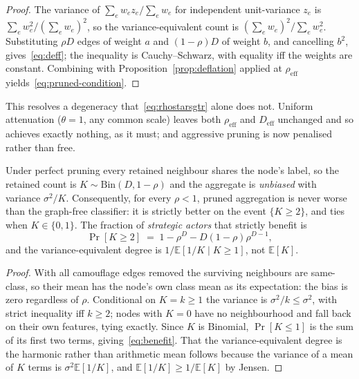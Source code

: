 \documentclass[../elsevier.tex]{subfiles}
\begin{document}
\begin{proof}
The variance of $\sum_e w_e z_e / \sum_e w_e$ for independent unit-variance $z_e$ is
$\sum_e w_e^2/(\sum_e w_e)^2$, so the variance-equivalent count is
$(\sum_e w_e)^2/\sum_e w_e^2$. Substituting $\rho D$ edges of weight $a$ and
$(1-\rho)D$ of weight $b$, and cancelling $b^2$, gives~\eqref{eq:deff}; the
inequality is Cauchy--Schwarz, with equality iff the weights are constant.
Combining with Proposition~\ref{prop:deflation} applied at $\rho_{\mathrm{eff}}$
yields~\eqref{eq:pruned-condition}.
\end{proof}

This resolves a degeneracy that~\eqref{eq:rhostarsgtr} alone does not. Uniform
attenuation ($\theta = 1$, any common scale) leaves both $\rho_{\mathrm{eff}}$ and
$D_{\mathrm{eff}}$ unchanged and so achieves exactly nothing, as it must; and
aggressive pruning is now penalised rather than free.

\begin{proposition}
\label{cor:ceiling}
Under perfect pruning every retained neighbour shares the node's label, so the
retained count is $K \sim \mathrm{Bin}(D, 1-\rho)$ and the aggregate is
\emph{unbiased} with variance $\sigma^2/K$. Consequently, for every $\rho<1$,
pruned aggregation is never worse than the graph-free classifier: it is strictly
better on the event $\{K\geq2\}$, and ties when $K\in\{0,1\}$. The fraction of \emph{strategic actors}
that strictly benefit is
\begin{equation}
    \Pr[K \geq 2] \;=\; 1 - \rho^{D} - D(1-\rho)\rho^{D-1},
    \label{eq:benefit}
\end{equation}
and the variance-equivalent degree is $1/\mathbb{E}[1/K \mid K\geq1]$, not
$\mathbb{E}[K]$.
\end{proposition}

\begin{proof}
With all camouflage edges removed the surviving neighbours are same-class, so their
mean has the node's own class mean as its expectation: the bias is zero regardless of
$\rho$. Conditional on $K=k\geq1$ the variance is $\sigma^2/k \leq \sigma^2$, with
strict inequality iff $k\geq2$; nodes with $K=0$ have no neighbourhood and fall back
on their own features, tying exactly. Since $K$ is Binomial, $\Pr[K\leq1]$ is the sum
of its first two terms, giving~\eqref{eq:benefit}. That the variance-equivalent
degree is the harmonic rather than arithmetic mean follows because the variance of a
mean of $K$ terms is $\sigma^2\mathbb{E}[1/K]$, and
$\mathbb{E}[1/K] \geq 1/\mathbb{E}[K]$ by Jensen.
\end{proof}
\end{document}
